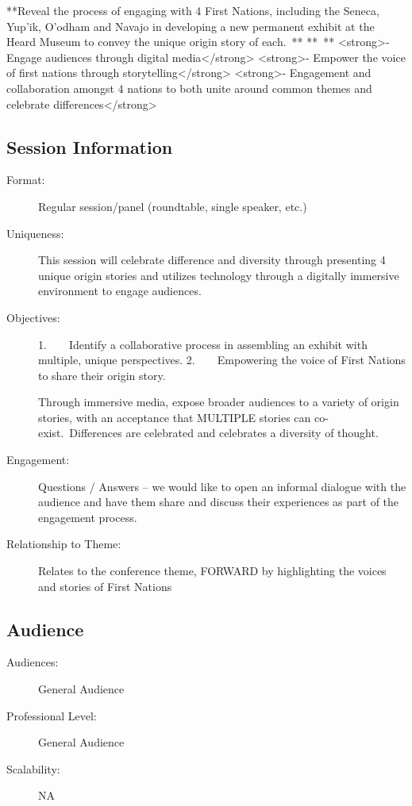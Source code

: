 \documentclass{report}
\begin{document}
              **Reveal the process of engaging with 4 First Nations, including the Seneca, Yup’ik, O’odham and Navajo in developing a new permanent exhibit at the Heard Museum to convey the unique origin story of each. **
** **
<strong>- Engage audiences through digital media</strong>
<strong>- Empower the voice of first nations through storytelling</strong>
<strong>- Engagement and collaboration amongst 4 nations to both unite around common themes and celebrate differences</strong>

              \subsection*{Session Information}
                \begin{description}
                  \item [Format:] Regular session/panel (roundtable, single speaker, etc.)
							    
							    \item [Uniqueness:]This session will celebrate difference and diversity through presenting 4 unique origin stories and utilizes technology through a digitally immersive environment to engage audiences.
							    \item [Objectives:]1.    Identify a collaborative process in assembling an exhibit with multiple, unique perspectives.
2.    Empowering the voice of First Nations to share their origin story.

Through immersive media, expose broader audiences to a variety of origin stories, with an acceptance that MULTIPLE stories can co-exist. Differences are celebrated and celebrates a diversity of thought.
							    \item [Engagement:]Questions / Answers – we would like to open an informal dialogue with the audience and have them share and discuss their experiences as part of the engagement process.
							    \item [Relationship to Theme:]Relates to the conference theme, FORWARD by highlighting the voices and stories of First Nations
							    
                \end{description}
              \subsection*{Audience}
                \begin{description}
                  \item [Audiences:]General Audience~
                  \item[Professional Level:]General Audience~
                \item[Scalability:] NA	

							
              \end{description}
\end{document}

